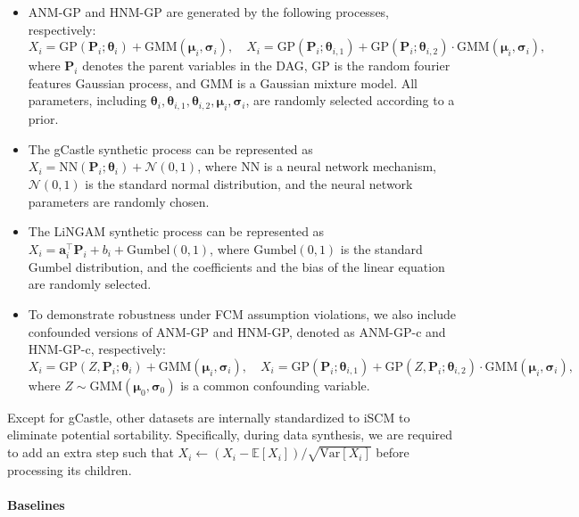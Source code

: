 \documentclass{article}
\theoremstyle{plain}
\theoremstyle{definition}
\theoremstyle{remark}
\begin{document}
\begin{itemize}[leftmargin=*]
\itemsep0em
\item ANM-GP and HNM-GP are generated by the following processes, respectively:
\[X_i=\text{GP}(\bm{P}_i;\bm{\theta}_i)+\text{GMM}(\bm{\mu}_i,\bm{\sigma}_i),\quad X_i=\text{GP}(\bm{P}_i;\bm{\theta}_{i,1})+\text{GP}(\bm{P}_i;\bm{\theta}_{i,2})\cdot\text{GMM}(\bm{\mu}_i,\bm{\sigma}_i),\]
where $\bm{P}_i$ denotes the parent variables in the DAG, $\text{GP}$ is the random fourier features Gaussian process, and $\text{GMM}$ is a Gaussian mixture model. All parameters, including $\bm{\theta}_{i},\bm{\theta}_{i,1},\bm{\theta}_{i,2},\bm{\mu}_i,\bm{\sigma}_i$, are randomly selected according to a prior.
\item The gCastle \citep{Zhang2021} synthetic process can be represented as $X_i=\text{NN}(\bm{P}_i;\bm{\theta}_i)+\mathcal{N}(0,1)$, where $\text{NN}$ is a neural network mechanism, $\mathcal{N}(0,1)$ is the standard normal distribution, and the neural network parameters are randomly chosen.
\item The LiNGAM \citep{Shimizu2006} synthetic process can be represented as $X_i=\bm{a}_i^\intercal\bm{P}_i+b_i+\text{Gumbel}(0,1)$, where $\text{Gumbel}(0,1)$ is the standard Gumbel distribution, and the coefficients and the bias of the linear equation are randomly selected.
\item To demonstrate robustness under FCM assumption violations, we also include confounded versions of ANM-GP and HNM-GP, denoted as ANM-GP-c and HNM-GP-c, respectively:
\[X_i=\text{GP}(Z,\bm{P}_i;\bm{\theta}_i)+\text{GMM}(\bm{\mu}_i,\bm{\sigma}_i),\quad X_i=\text{GP}(\bm{P}_i;\bm{\theta}_{i,1})+\text{GP}(Z,\bm{P}_i;\bm{\theta}_{i,2})\cdot\text{GMM}(\bm{\mu}_i,\bm{\sigma}_i),\]
where $Z\sim\text{GMM}(\bm{\mu}_0,\bm{\sigma}_0)$ is a common confounding variable.
\end{itemize}

Except for gCastle, other datasets are internally standardized to iSCM \citep{Ormaniec2025} to eliminate potential sortability. Specifically, during data synthesis, we are required to add an extra step such that $X_i\gets(X_i-\mathbb{E}[X_i])/\sqrt{\text{Var}[X_i]}$ before processing its children.

\paragraph{Baselines}
\end{document}
